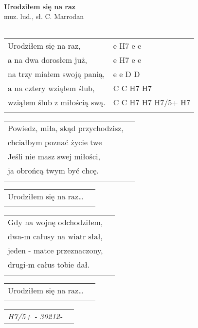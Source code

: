 \documentclass[a5paper]{article}
\begin{document}


\noindent
\fontsize{12pt}{15pt}\selectfont
\textbf{Urodziłem się na raz} \\
\fontsize{8pt}{10pt}\selectfont
muz. lud., sł. C. Marrodan \\ \\
\fontsize{10pt}{12pt}\selectfont

\begin{tabular}{@{}p{5.50cm}p{4cm}@{}}
\noindent
Urodziłem się na raz, & e H7 e e \\
a na dwa dorosłem już, & e H7 e e \\
na trzy miałem swoją panią, & e e D D \\
a na cztery wziąłem ślub, & C C H7 H7 \\
wziąłem ślub z miłością swą. & C C H7 H7 H7/5+ H7 \\ \\
\end{tabular}

\noindent
\begin{tabular}{@{}p{7.50cm}p{3cm}@{}}
Powiedz, miła, skąd przychodzisz, \\
chciałbym poznać życie twe \\
Jeśli nie masz swej miłości, \\
ja obrońcą twym być chcę. \\ \\
\end{tabular}

\noindent
\begin{tabular}{@{}p{7.50cm}p{3cm}@{}}
Urodziłem się na raz… \\ \\
\end{tabular}

\noindent
\begin{tabular}{@{}p{7.50cm}p{3cm}@{}}
Gdy na wojnę odchodziłem,\\
dwa-m całusy na wiatr słał,\\
jeden - matce przeznaczony,\\
drugi-m całus tobie dał.\\ \\
\end{tabular}

\noindent
\begin{tabular}{@{}p{7.50cm}p{3cm}@{}}
Urodziłem się na raz… \\ \\
\end{tabular}

\noindent
\begin{tabular}{@{}p{7.50cm}p{3cm}@{}}
\emph{H7/5+ - 30212-}
\end{tabular}
\end{document}
